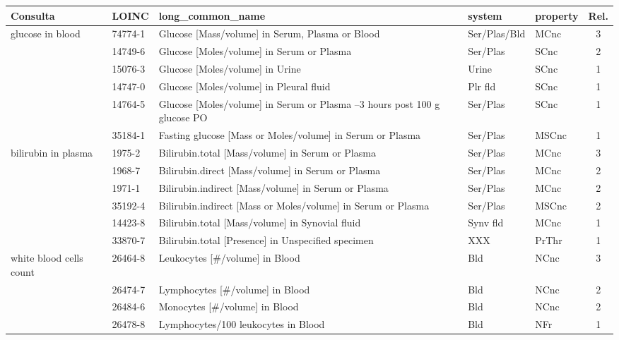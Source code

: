 \begin{tabular}{llp{6.2cm}llc}
\toprule
Consulta & LOINC & long\_common\_name & system & property & Rel. \\
\midrule
glucose in blood & 74774-1 & Glucose [Mass/volume] in Serum, Plasma or Blood & Ser/Plas/Bld & MCnc & 3 \\
 & 14749-6 & Glucose [Moles/volume] in Serum or Plasma & Ser/Plas & SCnc & 2 \\
 & 15076-3 & Glucose [Moles/volume] in Urine & Urine & SCnc & 1 \\
 & 14747-0 & Glucose [Moles/volume] in Pleural fluid & Plr fld & SCnc & 1 \\
 & 14764-5 & Glucose [Moles/volume] in Serum or Plasma --3 hours post 100 g glucose PO & Ser/Plas & SCnc & 1 \\
 & 35184-1 & Fasting glucose [Mass or Moles/volume] in Serum or Plasma & Ser/Plas & MSCnc & 1 \\
\midrule
bilirubin in plasma & 1975-2 & Bilirubin.total [Mass/volume] in Serum or Plasma & Ser/Plas & MCnc & 3 \\
 & 1968-7 & Bilirubin.direct [Mass/volume] in Serum or Plasma & Ser/Plas & MCnc & 2 \\
 & 1971-1 & Bilirubin.indirect [Mass/volume] in Serum or Plasma & Ser/Plas & MCnc & 2 \\
 & 35192-4 & Bilirubin.indirect [Mass or Moles/volume] in Serum or Plasma & Ser/Plas & MSCnc & 2 \\
 & 14423-8 & Bilirubin.total [Mass/volume] in Synovial fluid & Synv fld & MCnc & 1 \\
 & 33870-7 & Bilirubin.total [Presence] in Unspecified specimen & XXX & PrThr & 1 \\
\midrule
white blood cells count & 26464-8 & Leukocytes [\#/volume] in Blood & Bld & NCnc & 3 \\
 & 26474-7 & Lymphocytes [\#/volume] in Blood & Bld & NCnc & 2 \\
 & 26484-6 & Monocytes [\#/volume] in Blood & Bld & NCnc & 2 \\
 & 26478-8 & Lymphocytes/100 leukocytes in Blood & Bld & NFr & 1 \\
\bottomrule
\end{tabular}

